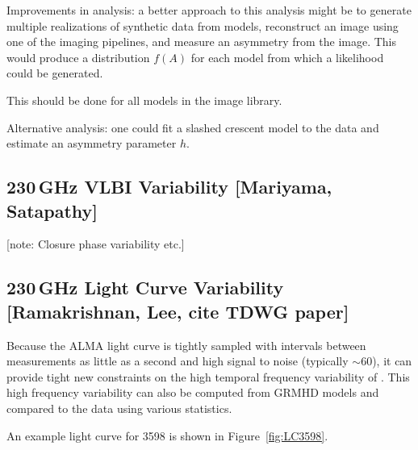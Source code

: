 \documentclass[twocolumn,tighten,dvipsnames]{aastex63}
\newcommand\note[1]{{\color{OliveGreen}[note: #1]}}
\begin{document}
Improvements in analysis: a better approach to this analysis might be to generate multiple realizations of synthetic data from models, reconstruct an image using one of the imaging pipelines, and measure an asymmetry from the image.  This would produce a distribution $f(A)$ for each model from which a likelihood could be generated.

This should be done for all models in the \sgra image library.

Alternative analysis: one could fit a slashed crescent model to the data and estimate an asymmetry parameter $h$.

\subsection{230\,GHz VLBI Variability
  [Mariyama, Satapathy]}
\label{sec:230variability}

\note{Closure phase variability etc.}


\subsection{230\,GHz Light Curve Variability
  [Ramakrishnan, Lee, cite TDWG paper]}
\label{sec:230lightcurve}

Because the ALMA light curve is tightly sampled with intervals  between measurements as little as a second and high signal to noise (typically $\sim 60$), it can provide tight new constraints on the high temporal frequency variability of \sgra.  This high frequency variability can also be computed from GRMHD models and compared to the data using various statistics.

An example light curve for 3598 is shown in Figure~\ref{fig:LC3598}.
\end{document}

